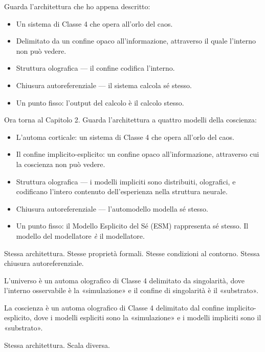 \documentclass[11pt, twoside, openright]{book}
\begin{document}
Guarda l'architettura che ho appena descritto:

\begin{itemize}
  \item Un sistema di Classe 4 che opera all'orlo del caos.
  \item Delimitato da un confine opaco all'informazione, attraverso il quale l'interno non può vedere.
  \item Struttura olografica --- il confine codifica l'interno.
  \item Chiusura autoreferenziale --- il sistema calcola sé stesso.
  \item Un punto fisso: l'output del calcolo è il calcolo stesso.
\end{itemize}

Ora torna al Capitolo 2. Guarda l'architettura a quattro modelli della coscienza:

\begin{itemize}
  \item L'automa corticale: un sistema di Classe 4 che opera all'orlo del caos.
  \item Il confine implicito-esplicito: un confine opaco all'informazione, attraverso cui la coscienza non può vedere.
  \item Struttura olografica --- i modelli impliciti sono distribuiti, olografici, e codificano l'intero contenuto dell'esperienza nella struttura neurale.
  \item Chiusura autoreferenziale --- l'automodello modella sé stesso.
  \item Un punto fisso: il Modello Esplicito del Sé (ESM) rappresenta sé stesso. Il modello del modellatore \textit{è} il modellatore.
\end{itemize}

Stessa architettura. Stesse proprietà formali. Stesse condizioni al contorno. Stessa chiusura autoreferenziale.

L'universo è un automa olografico di Classe 4 delimitato da singolarità, dove l'interno osservabile è la «simulazione» e il confine di singolarità è il «substrato».

La coscienza è un automa olografico di Classe 4 delimitato dal confine implicito-esplicito, dove i modelli espliciti sono la «simulazione» e i modelli impliciti sono il «substrato».

Stessa architettura. Scala diversa.
\end{document}
